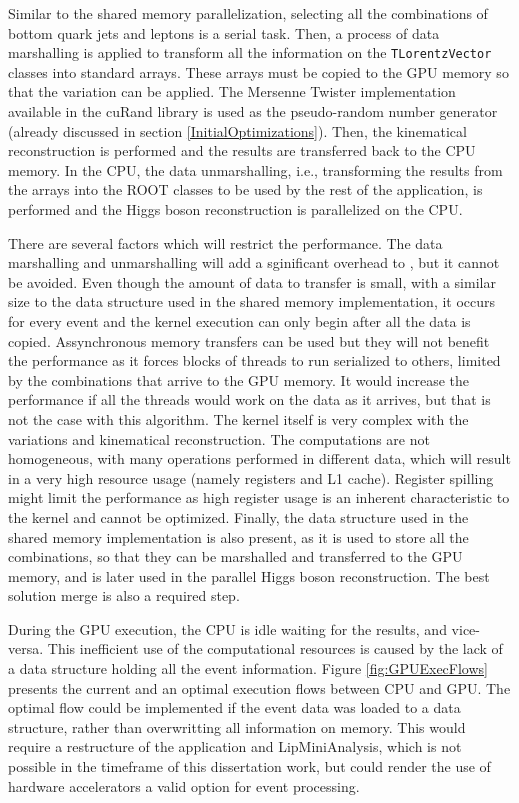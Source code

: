 Similar to the shared memory parallelization, selecting all the combinations of bottom quark jets and leptons is a serial task. Then, a process of data marshalling is applied to transform all the information on the \texttt{TLorentzVector} classes into standard arrays. These arrays must be copied to the GPU memory so that the variation can be applied. The Mersenne Twister implementation available in the \nvidia cuRand library is used as the pseudo-random number generator (already discussed in section \ref{InitialOptimizations}). Then, the kinematical reconstruction is performed and the results are transferred back to the CPU memory. In the CPU, the data unmarshalling, i.e., transforming the results from the arrays into the ROOT classes to be used by the rest of the application, is performed and the Higgs boson reconstruction is parallelized on the CPU.

There are several factors which will restrict the performance. The data marshalling and unmarshalling will add a sginificant overhead to \ttDilepKinFit, but it cannot be avoided. Even though the amount of data to transfer is small, with a similar size to the data structure used in the shared memory implementation, it occurs for every event and the kernel execution can only begin after all the data is copied. Assynchronous memory transfers can be used but they will not benefit the performance as it forces blocks of threads to run serialized to others, limited by the combinations that arrive to the GPU memory. It would increase the performance if all the threads would work on the data as it arrives, but that is not the case with this algorithm. The kernel itself is very complex with the variations and kinematical reconstruction. The computations are not homogeneous, with many operations performed in different data, which will result in a very high resource usage (namely registers and L1 cache). Register spilling might limit the performance as high register usage is an inherent characteristic to the kernel and cannot be optimized. Finally, the data structure used in the shared memory implementation is also present, as it is used to store all the combinations, so that they can be marshalled and transferred to the GPU memory, and is later used in the parallel Higgs boson reconstruction. The best solution merge is also a required step.

During the GPU execution, the CPU is idle waiting for the results, and vice-versa. This inefficient use of the computational resources is caused by the lack of a data structure holding all the event information. Figure \ref{fig:GPUExecFlows} presents the current and an optimal execution flows between CPU and GPU. The optimal flow could be implemented if the event data was loaded to a data structure, rather than overwritting all information on memory. This would require a restructure of the application and LipMiniAnalysis, which is not possible in the timeframe of this dissertation work, but could render the use of hardware accelerators a valid option for event processing.

